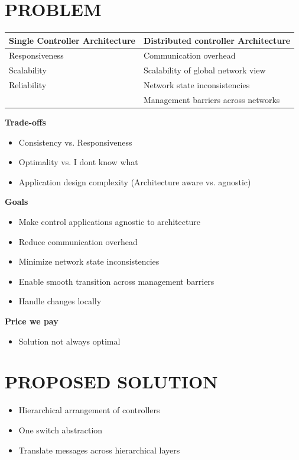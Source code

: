 \documentclass[a0,portrait]{a0poster}
\begin{document}
\begin{multicols}{2}
\color{SaddleBrown}%
\section*{PROBLEM}
\color{DarkSlateGray}
\begin{tabular} {l | l}
    \textbf{Single Controller Architecture} & \textbf{Distributed controller Architecture} \\
    \hline
    Responsiveness & Communication overhead \\
       Scalability & Scalability of global network view \\
       Reliability & Network state inconsistencies \\
                   & Management barriers across networks
\end{tabular}

\textbf{Trade-offs}
\begin{itemize}
    \item Consistency vs. Responsiveness
    \item Optimality vs. I dont know what
    \item Application design complexity (Architecture aware vs. agnostic)\\
\end{itemize}

\textbf{Goals}
\begin{itemize}
    \item Make control applications agnostic to architecture
    \item Reduce communication overhead
    \item Minimize network state inconsistencies
    \item Enable smooth transition across management barriers
    \item Handle changes locally \\
\end{itemize}

\textbf{Price we pay}
\begin{itemize}
    \item Solution not always optimal
\end{itemize}

\color{SaddleBrown}
\section*{PROPOSED SOLUTION}
\color{DarkSlateGray}
\begin{itemize}
    \item Hierarchical arrangement of controllers
    \item One switch abstraction
    \item Translate messages across hierarchical layers
\end{itemize}


\end{multicols}
\end{document}
